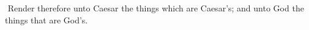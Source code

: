 \documentclass[MAIN]{subfiles}
\begin{document}
$ ${\color{red} Render therefore unto Caesar the things which are Caesar's; and unto God the things that are God's.}
\end{document}
